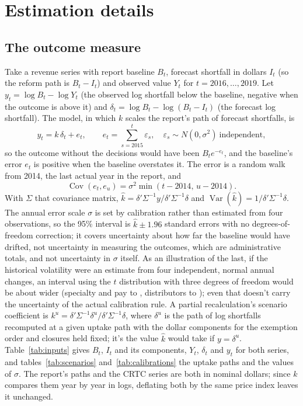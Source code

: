 
\appendix
\section{Estimation details}
\label{app:methods}

\subsection*{The outcome measure}
Take a revenue series with report baseline \(B_t\), forecast shortfall in dollars \(I_t\) (so the reform path is \(B_t-I_t\)) and observed value \(Y_t\) for \(t=2016,\dots,2019\). Let \(y_t=\log B_t-\log Y_t\) (the observed log shortfall below the baseline, negative when the outcome is above it) and \(\delta_t=\log B_t-\log(B_t-I_t)\) (the forecast log shortfall). The model, in which \(k\) scales the report's path of forecast shortfalls, is
\[
y_t = k\,\delta_t + e_t,\qquad e_t=\sum_{s=2015}^{t}\varepsilon_s,\quad \varepsilon_s\sim N(0,\sigma^2)\ \text{independent},
\]
so the outcome without the decisions would have been \(B_te^{-e_t}\), and the baseline's error \(e_t\) is positive when the baseline overstates it. The error is a random walk from 2014, the last actual year in the report, and
\[
\operatorname{Cov}(e_t,e_u)=\sigma^2\min(t-2014,\,u-2014).
\]
With \(\Sigma\) that covariance matrix, \(\hat k=\delta'\Sigma^{-1}y/\delta'\Sigma^{-1}\delta\) and \(\operatorname{Var}(\hat k)=1/\delta'\Sigma^{-1}\delta\). The annual error scale \(\sigma\) is set by calibration rather than estimated from four observations, so the 95\% interval is \(\hat k\pm1.96\) standard errors with no degrees-of-freedom correction; it covers uncertainty about how far the baseline would have drifted, not uncertainty in measuring the outcomes, which are administrative totals, and not uncertainty in \(\sigma\) itself. As an illustration of the last, if the historical volatility were an estimate from four independent, normal annual changes, an interval using the \(t\) distribution with three degrees of freedom would be about \lttvTThreeWiden{} wider (specialty and pay \lttvKSpecTThreeLo{} to \lttvKSpecTThreeHi{}, distributors \lttvKBDUTThreeLo{} to \lttvKBDUTThreeHi{}); even that doesn't carry the uncertainty of the actual calibration rule. A partial recalculation's scenario coefficient is \(k^{u}=\delta'\Sigma^{-1}\delta^{u}/\delta'\Sigma^{-1}\delta\), where \(\delta^{u}\) is the path of log shortfalls recomputed at a given uptake path with the dollar components for the exemption order and closures held fixed; it's the value \(\hat k\) would take if \(y=\delta^{u}\). Table~\ref{tab:inputs} gives \(B_t\), \(I_t\) and its components, \(Y_t\), \(\delta_t\) and \(y_t\) for both series, and tables~\ref{tab:scenarios} and~\ref{tab:calibrations} the uptake paths and the values of \(\sigma\). The report's paths and the CRTC series are both in nominal dollars; since \(k\) compares them year by year in logs, deflating both by the same price index leaves it unchanged.

